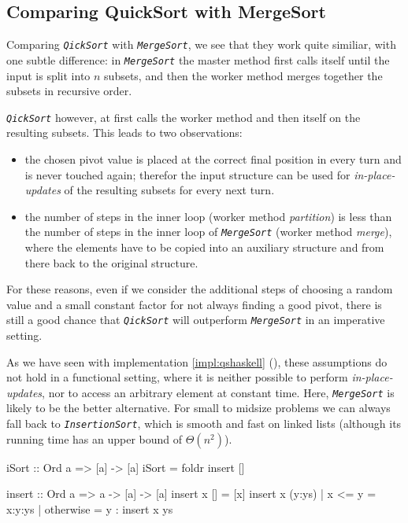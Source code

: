 \subsection{Comparing QuickSort with MergeSort}
Comparing \emph{\texttt{QickSort}} with \emph{\texttt{MergeSort}}, we see that they work quite similiar, with one subtle difference:
in \emph{\texttt{MergeSort}} the master method first calls itself until the input is split into $n$ subsets, and then the worker method merges together the subsets in recursive order.

\emph{\texttt{QickSort}} however, at first calls the worker method and then itself on the resulting subsets.
This leads to two observations:
\begin{itemize}
    \item the chosen pivot value is placed at the correct final position in every turn and is never touched again; therefor the input structure can be used for \emph{in-place-updates} of the resulting subsets for every next turn.
    \item the number of steps in the inner loop (worker method \emph{partition}) is less than the number of steps in the inner loop of \emph{\texttt{MergeSort}} (worker method \emph{merge}), where the elements have to be copied into an auxiliary structure and from there back to the original structure.
\end{itemize}

For these reasons, even if we consider the additional steps of choosing a random value and a small constant factor for not always finding a good pivot, there is still a good chance that \emph{\texttt{QickSort}} will outperform \emph{\texttt{MergeSort}} in an imperative setting.

As we have seen with implementation \ref{impl:qshaskell} (), these assumptions do not hold in a functional setting, where it is neither possible to perform \emph{in-place-updates}, nor to access an arbitrary element at constant time.
Here, \emph{\texttt{MergeSort}} is likely to be the better alternative. 
For small to midsize problems we can always fall back to \emph{\texttt{InsertionSort}}, which is smooth and fast on linked lists (although its running time has an upper bound of $\Theta (n^2)$).

\begin{impl}
\end{impl}

\begin{haskellcode}
  iSort :: Ord a => [a] -> [a]
  iSort = foldr insert []

  insert :: Ord a => a -> [a] -> [a]
  insert x [] = [x]
  insert x (y:ys) | x <= y = x:y:ys
                  | otherwise = y : insert x ys
\end{haskellcode}

